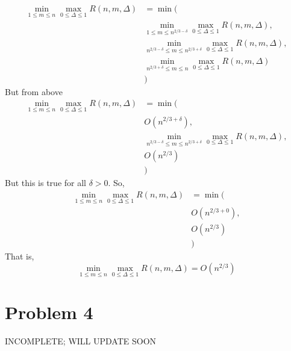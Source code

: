 \documentclass{article}
\theoremstyle{mytheoremstyle}
\theoremstyle{mytheoremstyle}
\theoremstyle{myproblemstyle}
\begin{document}
\begin{align*}
  \min_{1 \leq m \leq n} \max_{0 \leq \Delta \leq 1} R(n,m,\Delta) &= \min(\\
                                                                   &\min_{1 \leq m \leq n^{2/3 - \delta}} \max_{0 \leq \Delta \leq 1} R(n,m,\Delta),\\
                                                                   &\min_{n^{2/3 - \delta} \leq m \leq n^{2/3 + \delta}} \max_{0 \leq \Delta \leq 1} R(n,m,\Delta), \\
                                                                   &\min_{n^{2/3 + \delta} \leq m \leq n} \max_{0 \leq \Delta \leq 1} R(n,m,\Delta)\\ 
                                                                   &)
\end{align*}
But from above 
\begin{align*}
  \min_{1 \leq m \leq n} \max_{0 \leq \Delta \leq 1} R(n,m,\Delta) &= \min(\\
                                                                   & O(n^{2/3+\delta}),\\
                                                                   &\min_{n^{2/3 - \delta} \leq m \leq n^{2/3 + \delta}} \max_{0 \leq \Delta \leq 1} R(n,m,\Delta), \\
                                                                   &O(n^{2/3})\\
                                                                   &)
\end{align*}
But this is true for all $\delta > 0$. So, 
\begin{align*}
  \min_{1 \leq m \leq n} \max_{0 \leq \Delta \leq 1} R(n,m,\Delta) &= \min(\\
                                                                   & O(n^{2/3+0}),\\
                                                                   &O(n^{2/3})\\
                                                                   &)
\end{align*}
That is, 
$$\min_{1 \leq m \leq n} \max_{0 \leq \Delta \leq 1} R(n,m,\Delta) = O(n^{2/3}) $$

\section*{Problem 4}

INCOMPLETE; WILL UPDATE SOON
\end{document}
